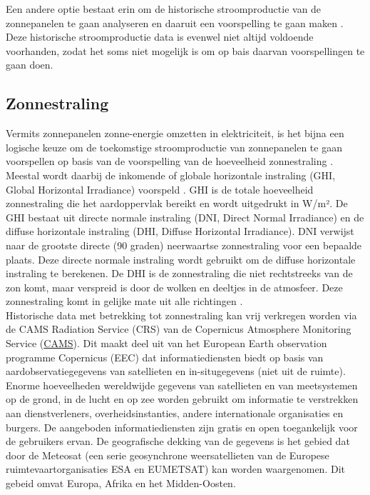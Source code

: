 Een andere optie bestaat erin om de historische stroomproductie van de zonnepanelen te gaan analyseren en daaruit een voorspelling te gaan maken \autocite{Wang2022}. Deze historische stroomproductie data is evenwel niet altijd voldoende voorhanden, zodat het soms niet mogelijk is om op bais daarvan voorspellingen te gaan doen.

\subsection{Zonnestraling}

Vermits zonnepanelen zonne-energie omzetten in elektriciteit, is het bijna een logische keuze om de toekomstige stroomproductie van zonnepanelen te gaan voorspellen op basis van de voorspelling van de hoeveelheid zonnestraling \autocite{Ledmaoui2023}. Meestal wordt daarbij de inkomende of globale horizontale instraling (GHI, Global Horizontal Irradiance) voorspeld . GHI is de totale hoeveelheid zonnestraling die het aardoppervlak bereikt en wordt uitgedrukt in W/m². De GHI bestaat uit directe normale instraling (DNI, Direct Normal Irradiance)  en de diffuse horizontale instraling (DHI, Diffuse Horizontal Irradiance). DNI verwijst naar de grootste directe (90 graden) neerwaartse zonnestraling voor een bepaalde plaats. Deze directe normale instraling wordt gebruikt om de diffuse horizontale instraling te berekenen. De DHI is de zonnestraling die niet rechtstreeks van de zon komt, maar verspreid is door de wolken en deeltjes in de atmosfeer. Deze zonnestraling komt in gelijke mate uit alle richtingen \autocite{Sehrawat2023}. \\

Historische data met betrekking tot zonnestraling kan vrij verkregen worden via de CAMS Radiation Service (CRS) van de Copernicus Atmosphere Monitoring Service (\href{https://atmosphere.copernicus.eu}{CAMS}). Dit maakt deel uit van het European Earth observation programme Copernicus (EEC) dat informatiediensten biedt op basis van aardobservatiegegevens van satellieten en in-situgegevens (niet uit de ruimte). Enorme hoeveelheden wereldwijde gegevens van satellieten en van meetsystemen op de grond, in de lucht en op zee worden gebruikt om informatie te verstrekken aan dienstverleners, overheidsinstanties, andere internationale organisaties en burgers. De aangeboden informatiediensten zijn gratis en open toegankelijk voor de gebruikers ervan. De geografische dekking van de gegevens is het gebied dat door de Meteosat (een serie geosynchrone weersatellieten van de Europese ruimtevaartorganisaties ESA en EUMETSAT) kan worden waargenomen. Dit gebeid omvat Europa, Afrika en het Midden-Oosten.

